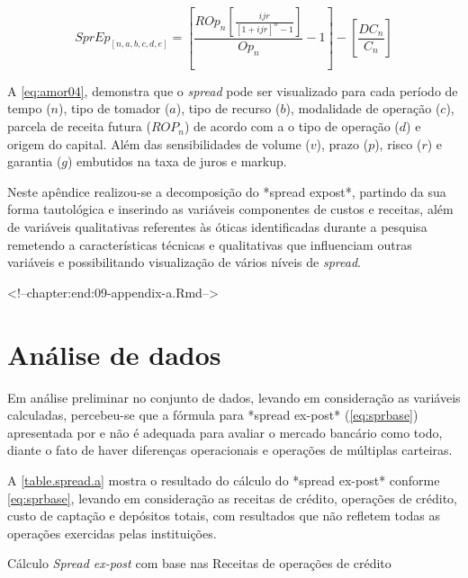 \documentclass[
  12pt,
  12pt,
  openright,
  oneside,
  a4paper,
  chapter=TITLE,
  section=TITLE,
  subsection=TITLE,
  subsubsection=TITLE,
  english,
  portugues,
  sumario=tradicional]{abntex2}
\begin{document}
\begin{apendicesenv}
\begin{equation}\label{eq:amor04}
SprEp_{[n,a,b,c,d,e]} = \left[ \frac{ROp_{n}[\frac{   ijr_{}  }{  [1 + ijr_{}]^n -1  }]}{Op_{n}} -1 \right] - \left[ \frac{DC_{n}}{C_{n}} \right]
\end{equation}


A \autoref{eq:amor04}, demonstra que o \emph{spread} pode ser visualizado para cada período de tempo ($n$), tipo de tomador ($a$), tipo de recurso ($b$), modalidade de operação ($c$), parcela de receita futura ($ROP_{n}$) de acordo com a o tipo de operação ($d$) e origem do capital. Além das sensibilidades de volume ($v$), prazo ($p$), risco ($r$) e garantia ($g$) embutidos na taxa de juros e markup.   


Neste apêndice realizou-se a decomposição do *spread expost*, partindo da sua forma tautológica e inserindo as variáveis componentes de custos e receitas, além de variáveis qualitativas referentes às óticas identificadas durante a pesquisa remetendo a características técnicas e qualitativas que influenciam outras variáveis e possibilitando visualização de vários níveis de \emph{spread}.

<!--chapter:end:09-appendix-a.Rmd-->

\chapter{Análise de dados}\label{apendiceb}

Em análise preliminar no conjunto de dados, levando em consideração as variáveis calculadas, percebeu-se que a fórmula para *spread ex-post* (\autoref{eq:sprbase}) apresentada por \textcite{dantas:2012} e \textcite{timotio:2018} não é adequada para avaliar o mercado bancário como todo, diante o fato de haver diferenças operacionais e operações de múltiplas carteiras. 

A \autoref{table.spread.a} mostra o resultado do cálculo do *spread ex-post* conforme \autoref{eq:sprbase}, levando em consideração as receitas de crédito, operações de crédito, custo de captação e depósitos totais, com resultados que não refletem todas as operações exercidas pelas instituições.



\begin{table}
\caption{Cálculo \emph{Spread ex-post} com base nas Receitas de operações de crédito}
\vspace{1mm}
\begingroup\fontsize{10}{12}\selectfont


\end{table}
\end{apendicesenv}
\end{document}
